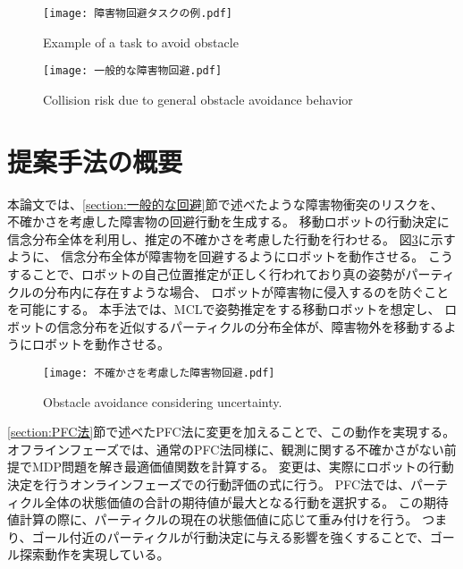 \begin{figure}[h]
  \begin{center}
    \texttt{[image: 障害物回避タスクの例.pdf]}
    \caption{Example of a task to avoid obstacle}
    \label{fig:障害物回避タスクの例}
  \end{center}
\end{figure}

\begin{figure}[h]
  \begin{center}
    \texttt{[image: 一般的な障害物回避.pdf]}
    \caption{Collision risk due to general obstacle avoidance behavior}
    \label{fig:一般的な障害物回避}
  \end{center}
\end{figure}


\section{提案手法の概要} \label{section:method overview}
本論文では、\ref{section:一般的な回避}節で述べたような障害物衝突のリスクを、
不確かさを考慮した障害物の回避行動を生成する。
移動ロボットの行動決定に信念分布全体を利用し、推定の不確かさを考慮した行動を行わせる。
図\ref{fig:不確かさを考慮した障害物回避}に示すように、
信念分布全体が障害物を回避するようにロボットを動作させる。
こうすることで、ロボットの自己位置推定が正しく行われており真の姿勢がパーティクルの分布内に存在すような場合、
ロボットが障害物に侵入するのを防ぐことを可能にする。
本手法では、MCLで姿勢推定をする移動ロボットを想定し、
ロボットの信念分布を近似するパーティクルの分布全体が、障害物外を移動するようにロボットを動作させる。

\begin{figure}[h]
  \begin{center}
    \texttt{[image: 不確かさを考慮した障害物回避.pdf]}
    \caption{Obstacle avoidance considering uncertainty.}
    \label{fig:不確かさを考慮した障害物回避}
  \end{center}
\end{figure}

\ref{section:PFC法}節で述べたPFC法に変更を加えることで、この動作を実現する。
オフラインフェーズでは、通常のPFC法同様に、観測に関する不確かさがない前提でMDP問題を解き最適価値関数を計算する。
変更は、実際にロボットの行動決定を行うオンラインフェーズでの行動評価の式に行う。
PFC法では、パーティクル全体の状態価値の合計の期待値が最大となる行動を選択する。
この期待値計算の際に、パーティクルの現在の状態価値に応じて重み付けを行う。
つまり、ゴール付近のパーティクルが行動決定に与える影響を強くすることで、ゴール探索動作を実現している。


